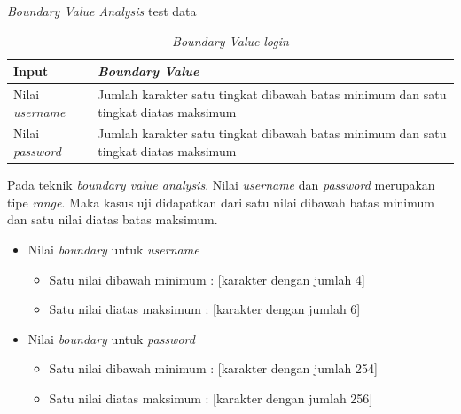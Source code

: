 \noindent
\emph{Boundary Value Analysis} test data

\newpage

\begin{longtable}[c]{|l|p{7cm}|}
  \caption{\emph{Boundary Value} \emph{login}} \label{tc:login-bva}\\
  \hline
  \textbf{Input} & \textbf{\emph{Boundary Value}}\\\hline
  Nilai \emph{username}  & Jumlah karakter satu tingkat dibawah batas minimum dan
                           satu tingkat diatas maksimum\\\hline
  Nilai \emph{password}  & Jumlah karakter satu tingkat dibawah batas minimum dan
                           satu tingkat diatas maksimum\\\hline
\end{longtable}

\noindent
Pada teknik \emph{boundary value analysis}. Nilai \emph{username} dan
\emph{password} merupakan tipe \emph{range}. Maka kasus uji didapatkan
dari satu nilai dibawah batas minimum dan satu nilai diatas batas
maksimum.

\begin{itemize}
\item Nilai \emph{boundary}  untuk \emph{username}
  \begin{itemize}
  \item Satu nilai dibawah minimum : [karakter dengan jumlah 4]
  \item Satu nilai diatas maksimum  : [karakter dengan jumlah 6]
  \end{itemize}
\item Nilai \emph{boundary} untuk \emph{password}
  \begin{itemize}
  \item Satu nilai dibawah minimum : [karakter dengan jumlah 254]
  \item Satu nilai diatas maksimum  : [karakter dengan jumlah 256]
  \end{itemize}
\end{itemize}


